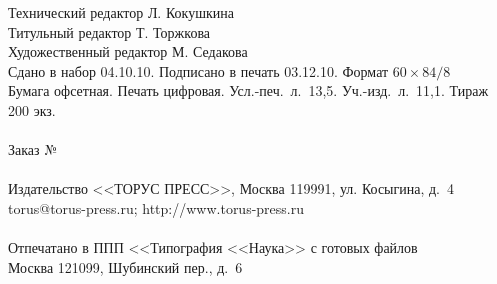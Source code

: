 \def\leftfootline{\small{\textbf{\thepage}
\hfill ИНФОРМАТИКА И ЕЁ ПРИМЕНЕНИЯ\ \ \ том~4\ \ \ выпуск~4\ \ \ 2010}
}%
 \def\rightfootline{\ %
}
 \label{end\stat}

\vfill



\begin{center}

 \def\rightfootline{\small{ИНФОРМАТИКА И ЕЁ ПРИМЕНЕНИЯ\ \ \ том~4\ \ \ выпуск~4\ \ \ 2010
\hfill \textbf{\thepage}}} 

Технический редактор Л. Кокушкина\\
Титульный редактор Т. Торжкова\\
Художественный редактор М. Седакова\\
Сдано в набор 04.10.10. Подписано в печать 03.12.10. Формат $60 \times 84 / 8$\\
Бумага офсетная. Печать цифровая. Усл.-печ.\ л.\ 13,5. Уч.-изд.\ л.\ 11,1. Тираж 200 экз.\\
\ \\
Заказ № \\
\ \\
Издательство <<ТОРУС ПРЕСС>>, Москва 119991, ул. Косыгина, д.~4\\
torus@torus-press.ru; http://www.torus-press.ru\\
\ \\
Отпечатано в ППП <<Типография <<Наука>> с готовых файлов\\
Москва 121099, Шубинский пер., д.~6\\
\end{center}